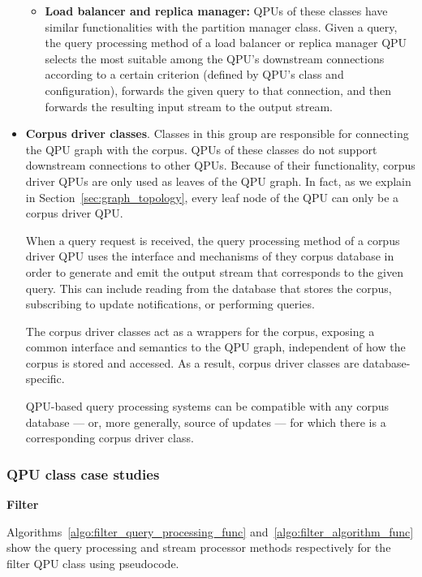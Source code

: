 \begin{itemize}
\begin{itemize}
    \item \textbf{Load balancer and replica manager:}
    QPUs of these classes have similar functionalities with the partition manager class.
    Given a query, the query processing method of a load balancer or replica manager QPU selects the most suitable
    among the QPU's downstream connections according to a certain criterion (defined by QPU's class and configuration),
    forwards the given query to that connection, and then forwards the resulting input stream to the output stream.
    \end{itemize}

  \item \textbf{Corpus driver classes}.
  Classes in this group are responsible for connecting the QPU graph with the corpus.
  QPUs of these classes do not support downstream connections to other QPUs.
  Because of their functionality, corpus driver QPUs are only used as leaves of the QPU graph.
  In fact, as we explain in Section~\ref{sec:graph_topology}, every leaf node of the QPU can only be a corpus driver QPU.

  When a query request is received, the query processing method of a corpus driver QPU uses the interface and mechanisms
  of they corpus database in order to generate and emit the output stream that corresponds to the given query.
  This can include reading from the database that stores the corpus, subscribing to update notifications,
  or performing queries.

  The corpus driver classes act as a wrappers for the corpus, exposing a common interface and semantics to the
  QPU graph, independent of how the corpus is stored and accessed.
  As a result, corpus driver classes are database-specific.

  QPU-based query processing systems can be compatible with any corpus database --- or, more generally, source of updates ---
  for which there is a corresponding corpus driver class.
\end{itemize}

\subsubsection{QPU class case studies}
\label{sec:qpu_class_examples}

\textbf{Filter}

Algorithms~\ref{algo:filter_query_processing_func} and~\ref{algo:filter_algorithm_func} show the query processing and
stream processor methods respectively for the filter QPU class using pseudocode.


